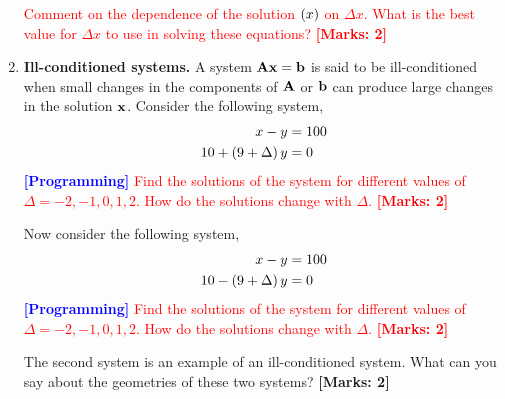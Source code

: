 \documentclass[12pt]{article}
\def\mf{\ensuremath\mathbf}
\def\mb{\ensuremath\mathbb}
\def\lp{\ensuremath\left(}
\def\rp{\ensuremath\right)}
\newcommand{\ct}[1]{\lp #1\rp}
\begin{document}
\begin{enumerate}
\textcolor{red}{Comment on the dependence of the solution $\ct{x}$ on $\Delta x$. What is the best value for $\Delta x$ to use in solving these equations? \textbf{[Marks: 2]}}

\item \textbf{Ill-conditioned systems.} A system $\mf{A}\mf{x} = \mf{b}$ is said to be ill-conditioned when small changes in the components of $\mf{A}$ or $\mf{b}$ can produce large changes in the solution $\mf{x}$. Consider the following system,
\begin{align}
x - y &= 100 \nonumber \\
10 + \ct{9 + \Delta}y &= 0 \nonumber
\end{align}
\textcolor{red}{\textcolor{blue}{\textbf{[Programming]}} Find the solutions of the system for different values of $\Delta = -2, -1, 0, 1, 2$. How do the solutions change with $\Delta$. \textbf{[Marks: 2]}} 

Now consider the following system,
\begin{align}
x - y &= 100 \nonumber \\
10 - \ct{9 + \Delta}y &= 0 \nonumber
\end{align}
\textcolor{red}{\textcolor{blue}{\textbf{[Programming]}} Find the solutions of the system for different values of $\Delta = -2, -1, 0, 1, 2$. How do the solutions change with $\Delta$. \textbf{[Marks: 2]}} 

The second system is an example of an ill-conditioned system. What can you say about the geometries of these two systems? \textbf{[Marks: 2]}



\end{enumerate}
\end{document}
